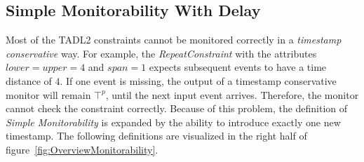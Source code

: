 	\subsection{Simple Monitorability With Delay}
		Most of the TADL2 constraints cannot be monitored correctly in a \emph{timestamp conservative} way. For example, the \emph{RepeatConstraint} with the attributes $lower=upper=4$ and $span=1$ expects subsequent events to have a time distance of $4$. If one event is missing, the output of a timestamp conservative monitor will remain $\top^p$, until the next input event arrives. Therefore, the monitor cannot check the constraint correctly. Because of this problem, the definition of \emph{Simple Monitorability} is expanded by the ability to introduce exactly one new timestamp. The following definitions are visualized in the right half of figure~\ref{fig:OverviewMonitorability}.
